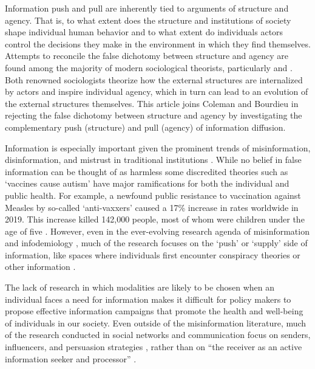 Information push and pull are inherently tied to arguments of structure and agency.
That is, to what extent does the structure and institutions of society shape 
individual human behavior and to what extent do individuals actors control 
the decisions they make in the environment in which they find themselves. 
Attempts to reconcile the false dichotomy between structure and agency
are found among the majority of modern sociological theorists, particularly  
\citet{coleman1994foundations} and \citet{bourdieu1987distinction}.
Both renowned sociologists theorize how the external structures
are internalized by actors and inspire individual agency, which in turn 
can lead to an evolution of the external structures themselves.  
This article joins Coleman and Bourdieu in rejecting the false dichotomy
between structure and agency by investigating the complementary push (structure)  
and pull (agency) of information diffusion.

Information is especially important given the prominent trends of
misinformation, disinformation, and mistrust in traditional institutions
\citep{starbird19, kata10}. While no belief in false information can be thought
of as harmless \citep{douglas21} some discredited theories such as `vaccines
cause autism' have major ramifications for both the individual and public
health. For example, a newfound public resistance to vaccination against Measles
by so-called `anti-vaxxers' caused a 17\% increase in rates worldwide in 2019.
This increase killed  142,000 people, most of whom were children under the age
of five \citep{givetash19}. However, even in the ever-evolving research agenda
of misinformation and infodemiology \citep{eysenbach02}, much of the research
focuses on the `push' or `supply' side of information, like spaces where
individuals first encounter conspiracy theories or other information
\citep{johnsonOnlineCompetitionPro2020, broniatowski_etal20}.

The lack of research in which modalities are likely to be chosen when an
individual faces a need for information makes it difficult for policy makers to
propose effective information campaigns that promote the health and well-being
of individuals in our society. Even outside of the misinformation literature,
much of the research conducted in social networks and communication focus on
senders, influencers, and persuasion strategies
\citep{mertonManifestLatentFunctions1968, katzPersonalInfluencePart1955,
lazarsfeldPeopleChoice1944}, rather than on ``the receiver as an active
information seeker and processor''
\citep[][p. 344]{johnsonComprehensiveModelCancerRelated1993} \citep[for an exception,
see][]{eysenbach09}.

